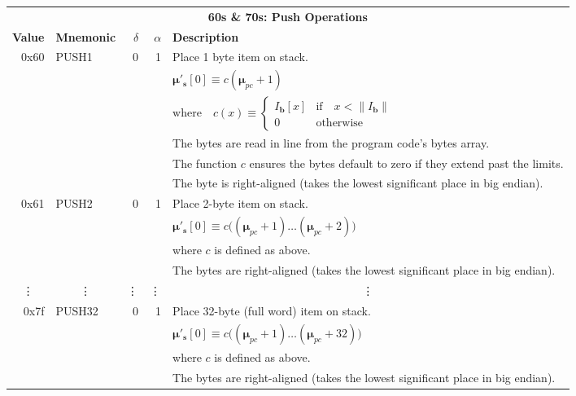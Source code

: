 \documentclass[9pt,oneside]{amsart}
\begin{document}
\begin{tabular*}{\columnwidth}[h]{rlrrl}
\toprule
\multicolumn{5}{c}{\textbf{60s \& 70s: Push Operations}} \vspace{5pt} \\
\textbf{Value} & \textbf{Mnemonic} & $\delta$ & $\alpha$ & \textbf{Description} \vspace{5pt} \\
0x60 & {\small PUSH1} & 0 & 1 & Place 1 byte item on stack. \\
&&&& $\boldsymbol{\mu}'_\mathbf{s}[0] \equiv c(\boldsymbol{\mu}_{pc} + 1)$ \\
&&&& $\text{where} \quad c(x) \equiv \begin{cases} I_\mathbf{b}[x] & \text{if} \quad x < \lVert I_\mathbf{b} \rVert \\ 0 & \text{otherwise} \end{cases}$ \\
&&&& The bytes are read in line from the program code's bytes array. \\
&&&& The function $c$ ensures the bytes default to zero if they extend past the limits.\\
&&&& The byte is right-aligned (takes the lowest significant place in big endian). \\
\midrule
0x61 & {\small PUSH2} & 0 & 1 & Place 2-byte item on stack. \\
&&&& $\boldsymbol{\mu}'_\mathbf{s}[0] \equiv c\big( (\boldsymbol{\mu}_{pc} + 1) \dots (\boldsymbol{\mu}_{pc} + 2) \big)$ \\
&&&& where $c$ is defined as above. \\
&&&& The bytes are right-aligned (takes the lowest significant place in big endian). \\
\midrule
\multicolumn{1}{c}{\vdots} & \multicolumn{1}{c}{\vdots} & \vdots & \vdots & \multicolumn{1}{c}{\vdots} \\
\midrule
0x7f & {\small PUSH32} & 0 & 1 & Place 32-byte (full word) item on stack. \\
&&&& $\boldsymbol{\mu}'_\mathbf{s}[0] \equiv c\big((\boldsymbol{\mu}_{pc} + 1) \dots (\boldsymbol{\mu}_{pc} + 32) \big)$ \\
&&&& where $c$ is defined as above. \\
&&&& The bytes are right-aligned (takes the lowest significant place in big endian). \\
\bottomrule
\end{tabular*}
\end{document}
